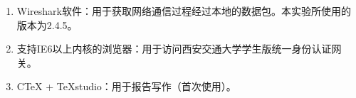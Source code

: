 \begin{enumerate}
	\item Wireshark软件：用于获取网络通信过程经过本地的数据包。本实验所使用的版本为2.4.5。
	\item 支持IE6以上内核的浏览器：用于访问西安交通大学学生版统一身份认证网关。
	\item CTeX + TeXstudio：用于报告写作（首次使用）。
\end{enumerate}